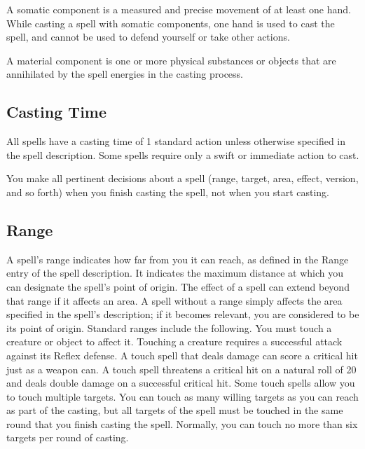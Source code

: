          A somatic component is a measured and precise movement of at least one hand.
        While casting a spell with somatic components, one hand is used to cast the spell, and cannot be used to defend yourself or take other actions.

         A material component is one or more physical substances or objects that are annihilated by the spell energies in the casting process.

    \subsection{Casting Time}
        All spells have a casting time of 1 standard action unless otherwise specified in the spell description.
        Some spells require only a swift or immediate action to cast.

        You make all pertinent decisions about a spell (range, target, area, effect, version, and so forth) when you finish casting the spell, not when you start casting.

    \subsection{Range}
        A spell's range indicates how far from you it can reach, as defined in the Range entry of the spell description.
        It indicates the maximum distance at which you can designate the spell's point of origin.
        The effect of a spell can extend beyond that range if it affects an area.
        A spell without a range simply affects the area specified in the spell's description; if it becomes relevant, you are considered to be its point of origin.
        Standard ranges include the following.
         You must touch a creature or object to affect it.
        Touching a creature requires a successful attack against its Reflex defense.
        A touch spell that deals damage can score a critical hit just as a weapon can.
        A touch spell threatens a critical hit on a natural roll of 20 and deals double damage on a successful critical hit.
        Some touch spells allow you to touch multiple targets.
        You can touch as many willing targets as you can reach as part of the casting, but all targets of the spell must be touched in the same round that you finish casting the spell.
        Normally, you can touch no more than six targets per round of casting.

